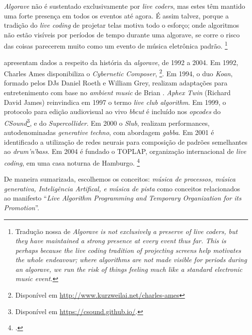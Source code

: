 \begin{citacao}
\emph{Algorave} não é sustentado exclusivamente por \emph{live coders}, mas estes têm mantido uma forte presença em todos os eventos até agora. É assim talvez, porque a tradição do \emph{live coding} de projetar telas motiva todo o esforço; onde algoritmos não estão visíveis por períodos de tempo durante uma algorave, se corre o risco das coisas parecerem muito como um evento de música eletrônica padrão. \cite[p.~356]{collins_algorave:_2014} \footnote{Tradução nossa de \emph{Algorave is not exclusively a preserve of live coders, but they have maintained a strong presence at every event thus far. This is perhaps because the live coding tradition of projecting screens help motivates the whole endeavour; where algorithms are not made visible for periods during an algorave, we run the risk of things feeling much like a standard electronic music event.}}
\end{citacao}


 apresentam dados a respeito da história da \emph{algorave}, de 1992 a 2004. Em 1992, Charles Ames disponibiliza o \emph{Cybernetic Composer}, \footnote{Disponível em \url{http://www.kurzweilai.net/charles-ames}}. Em 1994, o duo \emph{Koan}, formado pelos DJs Daniel Roeth e William Grey, realizam adaptações para entretenimento com base no \emph{ambient music} de Brian . \emph{Aphex Twin} (Richard David James) reinvindica em 1997 o termo \emph{live club algorithm}. Em 1999, o protocolo para edição audiovisual ao vivo \emph{bbcut} \cite{collins_bbcut_2003} é incluído nos \emph{opcodes} do \emph{CSound}\footnote{Disponível em \url{https://csound.github.io/}.}, e do \emph{Supercollider}. Em 2000 o \emph{Slub}, realizam performances, autodenominadas \emph{generative techno}, com abordagem \emph{gabba}. Em 2001 é identificado a utilização de redes neurais para composição de padrões semelhantes ao \emph{drum'n'bass}. Em 2004 é fundado o TOPLAP, organização internacional  de \emph{live coding}, em uma casa noturna de Hamburgo. \footnote{.}

De maneira sumarizada, escolhemos os conceitos: \emph{música de processos, música generativa, Inteligência Artifical, e música de pista} como conceitos relacionados ao manifesto ``\emph{Live Algorithm Programming and Temporary Organization for its Promotion}''.

